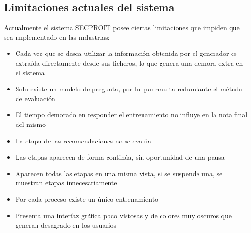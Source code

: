 \subsection{Limitaciones actuales del sistema}
Actualmente el sistema SECPROIT posee ciertas limitaciones que impiden que sea implementado en las industrias:
\begin{itemize}
\item Cada vez que se desea utilizar la información obtenida por el generador es extraída directamente desde sus ficheros, lo que genera una demora extra en el sistema
\item Solo existe un modelo de pregunta, por lo que resulta redundante el método de evaluación
\item El tiempo demorado en responder el entrenamiento no influye en la nota final del mismo
\item La etapa de las recomendaciones no se evalúa
\item Las etapas aparecen de forma continúa, sin oportunidad de una pausa
\item Aparecen todas las etapas en una misma vista, si se suspende una, se muestran etapas innecesariamente
\item Por cada proceso existe un único entrenamiento
\item Presenta una interfaz gráfica poco vistosas y de colores muy oscuros que generan desagrado en los usuarios
\end{itemize}


